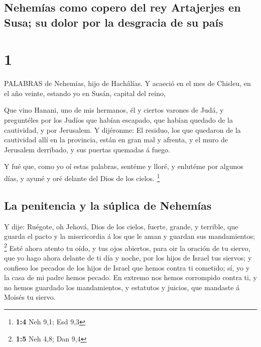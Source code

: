 \hypertarget{nehemuxedas-como-copero-del-rey-artajerjes-en-susa-su-dolor-por-la-desgracia-de-su-pauxeds}{%
\subsection{Nehemías como copero del rey Artajerjes en Susa; su dolor
por la desgracia de su
país}\label{nehemuxedas-como-copero-del-rey-artajerjes-en-susa-su-dolor-por-la-desgracia-de-su-pauxeds}}

\hypertarget{section}{%
\section{1}\label{section}}

 PALABRAS de Nehemías, hijo de Hachâlías. Y acaeció en el
mes de Chisleu, en el año veinte, estando yo en Susán, capital del
reino,

 Que vino Hanani, uno de mis hermanos, él y ciertos varones
de Judá, y preguntéles por los Judíos que habían escapado, que habían
quedado de la cautividad, y por Jerusalem.  Y dijéronme: El
residuo, los que quedaron de la cautividad allí en la provincia, están
en gran mal y afrenta, y el muro de Jerusalem derribado, y sus puertas
quemadas á fuego.

 Y fué que, como yo oí estas palabras, sentéme y lloré, y
enlutéme por algunos días, y ayuné y oré delante del Dios de los cielos.
\footnote{\textbf{1:4} Neh 9,1; Esd 9,3}

\hypertarget{la-penitencia-y-la-suxfaplica-de-nehemuxedas}{%
\subsection{La penitencia y la súplica de
Nehemías}\label{la-penitencia-y-la-suxfaplica-de-nehemuxedas}}

 Y dije: Ruégote, oh Jehová, Dios de los cielos, fuerte,
grande, y terrible, que guarda el pacto y la misericordia á los que le
aman y guardan sus mandamientos; \footnote{\textbf{1:5} Neh 4,8; Dan 9,4}
 Esté ahora atento tu oído, y tus ojos abiertos, para oir la
oración de tu siervo, que yo hago ahora delante de ti día y noche, por
los hijos de Israel tus siervos; y confieso los pecados de los hijos de
Israel que hemos contra ti cometido; sí, yo y la casa de mi padre hemos
pecado.  En extremo nos hemos corrompido contra ti, y no
hemos guardado los mandamientos, y estatutos y juicios, que mandaste á
Moisés tu siervo.

